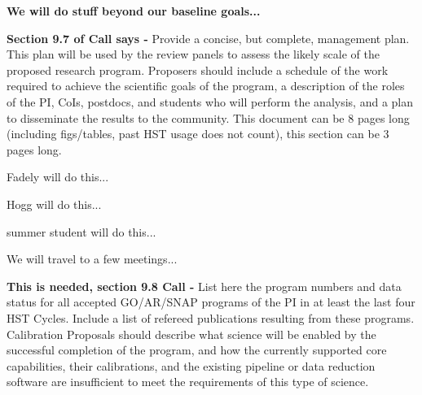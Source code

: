 \documentclass[12pt]{article}
\begin{document}
\textbf{We will do stuff beyond our baseline goals...}


%
%
\budgetnarrative       %

\textbf{Section 9.7 of Call says -} Provide a concise, but complete, 
management plan. This plan will be used by the review panels to assess 
the likely scale of the proposed research program. Proposers should 
include a schedule of the work required to achieve the scientific
goals of the program, a description of the roles of the PI, CoIs,
postdocs, and students who will perform the analysis, and a plan to 
disseminate the results to the community.  This document can be 8 
pages long (including figs/tables, past HST usage does not count),
this section can be 3 pages long.

Fadely will do this...

Hogg will do this...

summer student will do this...

We will travel to a few meetings...


%
%
%
\pasthstusage  %

\textbf{This is needed, section 9.8 Call -} List here the program 
numbers and data status for all accepted GO/AR/SNAP programs of the 
PI in at least the last four HST Cycles. Include a list of refereed 
publications resulting from these programs. Calibration Proposals 
should describe what science will be enabled by the successful 
completion of the program, and how the currently supported core 
capabilities, their calibrations, and the existing pipeline or data
reduction software are insufficient to meet the requirements of this 
type of science.
\end{document}
